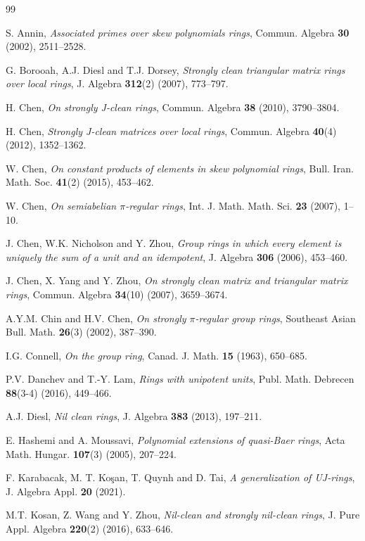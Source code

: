 \documentclass[12pt]{amsart}
\theoremstyle{definition}
\begin{document}
\begin{thebibliography}{99}
	
S. Annin, {\it Associated primes over skew polynomials rings}, Commun. Algebra {\bf 30} (2002), 2511--2528.

G. Borooah, A.J. Diesl and T.J. Dorsey, {\it Strongly clean triangular matrix rings over local rings}, J. Algebra {\bf 312}(2) (2007), 773--797.

H. Chen, {\it On strongly J-clean rings}, Commun. Algebra {\bf 38} (2010), 3790--3804.

H. Chen, {\it Strongly J-clean matrices over local rings}, Commun. Algebra {\bf 40}(4) (2012), 1352--1362.

W. Chen, {\it On constant products of elements in skew polynomial rings}, Bull. Iran. Math. Soc. {\bf 41}(2) (2015), 453--462.

W. Chen, {\it On semiabelian $\pi$-regular rings}, Int. J. Math. Math. Sci. {\bf 23} (2007), 1--10.

J. Chen, W.K. Nicholson and Y. Zhou, {\it Group rings in which every element is uniquely the sum of a unit and an idempotent}, J. Algebra {\bf 306} (2006), 453--460.

J. Chen, X. Yang and Y. Zhou, {\it On strongly clean matrix and triangular matrix rings}, Commun. Algebra {\bf 34}(10) (2007), 3659--3674.

A.Y.M. Chin and H.V. Chen, {\it On strongly $\pi$-regular group rings}, Southeast Asian Bull. Math. {\bf 26}(3) (2002), 387--390.

I.G. Connell, {\it On the group ring}, Canad. J. Math. {\bf 15} (1963), 650--685.

P.V. Danchev and T.-Y. Lam, {\it Rings with unipotent units}, Publ. Math. Debrecen {\bf 88}(3-4) (2016), 449--466.

A.J. Diesl, {\it Nil clean rings}, J. Algebra {\bf 383} (2013), 197--211.

E. Hashemi and A. Moussavi, {\it Polynomial extensions of quasi-Baer rings}, Acta Math. Hungar. {\bf 107}(3) (2005), 207--224.

F. Karabacak, M. T. Ko\c{s}an, T. Quynh and D. Tai, {\it A generalization of UJ-rings}, J. Algebra Appl. {\bf 20} (2021).

M.T. Kosan, Z. Wang and Y. Zhou, {\it Nil-clean and strongly nil-clean rings}, J. Pure Appl. Algebra {\bf 220}(2) (2016), 633--646.


\end{thebibliography}
\end{document}
